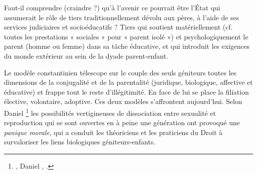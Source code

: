  
 Faut-il comprendre (craindre ?) qu'à l'avenir ce pourrait être l'État qui assumerait le rôle de tiers traditionnellement dévolu aux pères, à l'aide de ses services judiciaires et socioéducatifs ? Tiers qui soutient matériellement (cf. toutes les prestations « sociales » pour « parent isolé ») et psychologiquement le parent (homme ou femme) dans sa tâche éducative, et qui introduit les exigences du monde extérieur au sein de la dyade parent-enfant.
 
 Le modèle constantinien télescope sur le couple des seuls géniteurs toutes les dimensions de la conjugalité et de la parentalité (juridique, biologique, affective et éducative) et frappe tout le reste d'illégitimité. En face de lui se place la filiation élective, volontaire, adoptive. Ces deux modèles s'affrontent aujourd'hui. Selon Daniel 
\footnote{\href{http://www.universalis.fr/encyclopedie/famille-les-enjeux-de-la-parentalite/}{}, Daniel , .} les possibilités vertigineuses de dissociation entre sexualité et reproduction qui se sont ouvertes en à peine une génération ont provoqué une\emph{ panique morale}, qui a conduit les théoriciens et les praticiens du Droit à survaloriser les liens biologiques géniteurs-enfants. 

